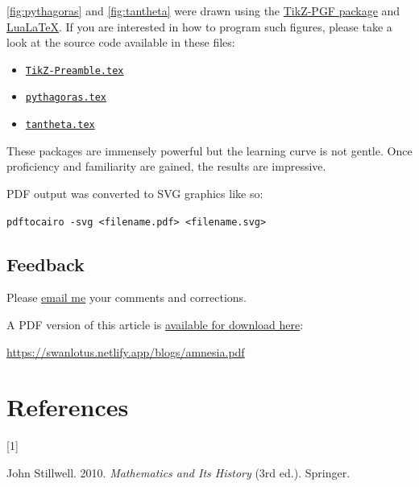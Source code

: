\documentclass[
  a4paper,
]{article}
\providecommand{\tightlist}{%
  \setlength{\itemsep}{0pt}\setlength{\parskip}{0pt}}
\newlength{\cslhangindent}
\newlength{\csllabelwidth}
\newenvironment{CSLReferences}[2] %
 {\begin{list}{}{%
  \setlength{\itemindent}{0pt}
  \setlength{\leftmargin}{0pt}
  \setlength{\parsep}{0pt}
  \ifodd #1
   \setlength{\leftmargin}{\cslhangindent}
   \setlength{\itemindent}{-1\cslhangindent}
  \fi
  \setlength{\itemsep}{#2\baselineskip}}}
 {\end{list}}
\newcommand{\CSLLeftMargin}[1]{\parbox[t]{\csllabelwidth}{\strut#1\strut}}
\newcommand{\CSLRightInline}[1]{\parbox[t]{\linewidth - \csllabelwidth}{\strut#1\strut}}
\begin{document}
\cref{fig:pythagoras} and \cref{fig:tantheta} were drawn using the
\href{https://en.wikipedia.org/wiki/PGF/TikZ}{TikZ-PGF package} and
\href{https://en.wikipedia.org/wiki/LuaTeX}{LuaLaTeX}. If you are
interested in how to program such figures, please take a look at the
source code available in these files:

\begin{itemize}
\tightlist
\item
  \href{auxiliary/TikZ-Preamble.tex}{\texttt{TikZ-Preamble.tex}}
\item
  \href{auxiliary/pythagoras.tex}{\texttt{pythagoras.tex}}
\item
  \href{auxiliary/tantheta.tex}{\texttt{tantheta.tex}}
\end{itemize}

These packages are immensely powerful but the learning curve is not
gentle. Once proficiency and familiarity are gained, the results are
impressive.

PDF output was converted to SVG graphics like so:

\texttt{pdftocairo\ -svg\ \textless{}filename.pdf\textgreater{}\ \textless{}filename.svg\textgreater{}}

\subsection{Feedback}\label{feedback}

Please \href{mailto:feedback.swanlotus@gmail.com}{email me} your
comments and corrections.

\noindent A PDF version of this article is
\href{./amnesia.pdf}{available for download here}:

\begin{small}

\begin{sffamily}

\url{https://swanlotus.netlify.app/blogs/amnesia.pdf}

\end{sffamily}

\end{small}

\section*{References}\label{bibliography}

\label{refs}
\begin{CSLReferences}{0}{0}
\CSLLeftMargin{{[}1{]} }%
\CSLRightInline{John Stillwell. 2010. \emph{{Mathematics and Its
History}} (3rd ed.). Springer.}

\end{CSLReferences}
\end{document}
